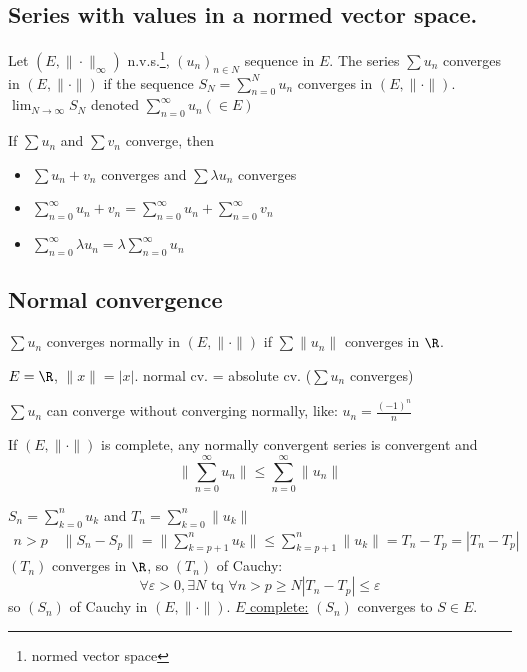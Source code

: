 \subsection{Series with values in a normed vector space.}
\begin{definition}
     Let $(E, \| \cdot \|_{\infty})$ n.v.s.\footnote{normed vector space}, $(u_n)_{n \in N}$ sequence in $E$. The series $\sum u_n$ converges in $(E, \| \cdot \|)$ if the sequence $S_N = \sum_{n=0}^{N} u_n$ converges in $(E, \| \cdot \|)$. $\lim_{N \to \infty} S_N$ denoted $\sum_{n=0}^{\infty} u_n (\in E)$
\end{definition}
\begin{remark}
   If $\sum u_n$ and $\sum v_n$ converge, then
   \begin{itemize}
       \item $\sum u_n + v_n$ converges and $\sum \lambda u_n$ converges
       \item $\sum_{n=0}^{\infty} u_n + v_n = \sum_{n=0}^{\infty} u_n + \sum_{n=0}^{\infty} v_n$ 
       \item $\sum_{n=0}^{\infty} \lambda u_n = \lambda \sum_{n=0}^{\infty} u_n$
   \end{itemize}
\end{remark}

\subsection{Normal convergence}
\begin{definition}
   $\sum u_n$ converges normally in $(E, \| \cdot \|)$ if $\sum \|u_n\|$ converges in $\R$. 
\end{definition}
\begin{eg}
   $E = \R$, $\|x\| = |x|$. normal cv. = absolute cv. ($\sum u_n$ converges) 
\end{eg}
\begin{eg}
   $\sum u_n$ can converge without converging normally, like: $u_n = \frac{(-1)^n}{n}$ 
\end{eg}

\begin{theorem}
    If $(E, \| \cdot \|)$ is complete, any normally convergent series is convergent and 
     \[
    \|\sum_{n=0}^{\infty} u_n\| \le \sum_{n=0}^{\infty} \|u_n\|
    \] 
\end{theorem}
\begin{preuve}
   $S_n = \sum_{k=0}^{n} u_k$ and $T_n = \sum_{k=0}^{n} \|u_k\|$ 
   \begin{align*}
       n > p \quad \|S_n - S_p\| = \|\sum_{k = p+1}^{n} u_k\| \le \sum_{k=p+1}^{n} \|u_k\| = T_n - T_p = |T_n - T_p|
   \end{align*}
    $(T_n)$ converges in $\R$, so $(T_n)$ of Cauchy:
     \[
    \forall \varepsilon > 0, \exists N \text{ tq } \forall n > p \ge N |T_n - T_p| \le \varepsilon
    \] 
    so $(S_n)$ of Cauchy in $(E, \| \cdot \|)$. \underline{$E$ complete:} $(S_n)$ converges to $S \in E$.
\end{preuve}
